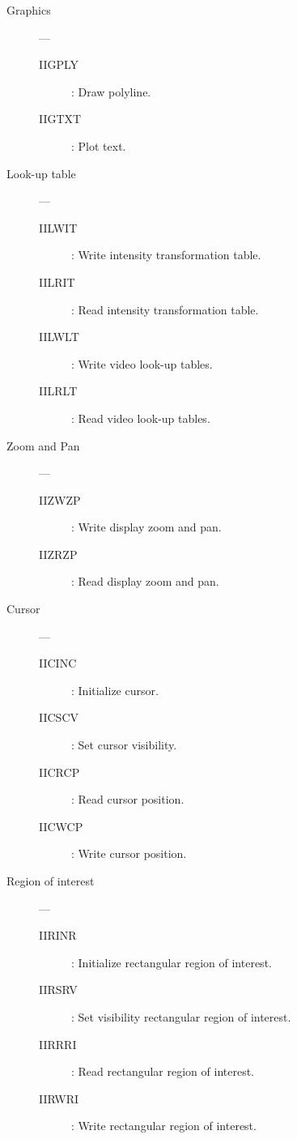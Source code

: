 \begin{description}
\item [Graphics] ---

\begin{description}
\item [IIGPLY] : Draw polyline.
\item [IIGTXT] : Plot text.
\end{description}

\item [Look-up table] ---

\begin{description}
\item [IILWIT] : Write intensity transformation table.
\item [IILRIT] : Read intensity transformation table.
\item [IILWLT] : Write video look-up tables.
\item [IILRLT] : Read video look-up tables.
\end{description}

\item [Zoom and Pan] ---

\begin{description}
\item [IIZWZP] : Write display zoom and pan.
\item [IIZRZP] : Read display zoom and pan.
\end{description}

\item [Cursor] ---

\begin{description}
\item [IICINC] : Initialize cursor.
\item [IICSCV] : Set cursor visibility.
\item [IICRCP] : Read cursor position.
\item [IICWCP] : Write cursor position.
\end{description}

\item [Region of interest] ---

\begin{description}
\item [IIRINR] : Initialize rectangular region of interest.
\item [IIRSRV] : Set visibility rectangular region of interest.
\item [IIRRRI] : Read rectangular region of interest.
\item [IIRWRI] : Write rectangular region of interest.
\end{description}


\end{description}
